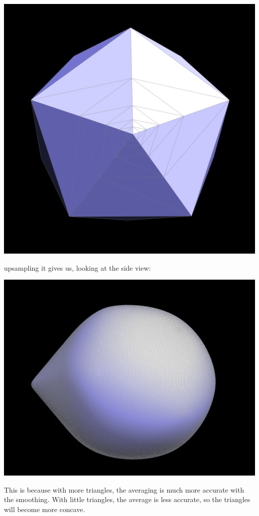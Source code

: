 \documentclass{article}
\begin{document}
\begin{center}
    \includegraphics[]{task 6/sharp.png}
\end{center}
upsampling it gives us, looking at the side view:
\begin{center}
    \includegraphics[]{task 6/sharpround.png}
\end{center}
This is because with more triangles, the averaging is much more accurate with the smoothing. With little triangles, the average is less accurate, so the triangles will become more concave.
\end{document}
